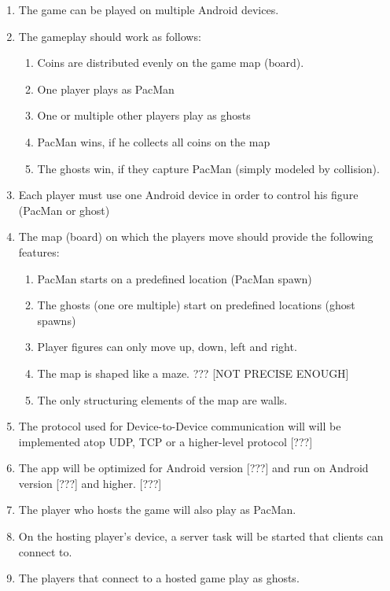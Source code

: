 \documentclass{report}
\begin{document}

\begin{enumerate}
	\item The game can be played on multiple Android devices.
	\item The gameplay should work as follows:
	\begin{enumerate}
		\item Coins are distributed evenly on the game map (board).
		\item One player plays as PacMan
		\item One or multiple other players play as ghosts
		\item PacMan wins, if he collects all coins on the map
		\item The ghosts win, if they capture PacMan (simply modeled by collision).
	\end{enumerate}
	\item Each player must use one Android device in order to control his figure (PacMan or ghost)
	\item The map (board) on which the players move should provide the following features:
	\begin{enumerate}
		\item PacMan starts on a predefined location (PacMan spawn)
		\item The ghosts (one ore multiple) start on predefined locations (ghost spawns)
		\item Player figures can only move up, down, left and right.
		\item The map is shaped like a maze. ??? [NOT PRECISE ENOUGH]
		\item The only structuring elements of the map are walls.
	\end{enumerate}
	\item The protocol used for Device-to-Device communication will will be implemented atop UDP, TCP or a higher-level protocol [???]
	\item The app will be optimized for Android version [???] and run on Android version [???] and higher. [???]
	\item The player who hosts the game will also play as PacMan.
	\item On the hosting player's device, a server task will be started that clients can connect to. 
	\item The players that connect to a hosted game play as ghosts.
	
\end{enumerate}
\end{document}
